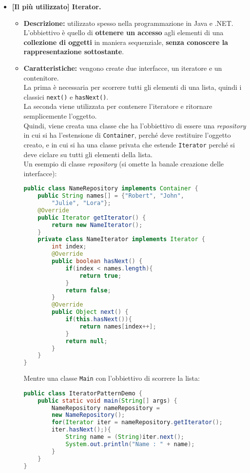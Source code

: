 \documentclass[a4paper,11pt]{article}
\begin{document}
\begin{itemize}
	\item[\ding{42}] \textbf{[Il più utilizzato] Iterator.}
		\begin{itemize}
			\item \textbf{Descrizione:} utilizzato spesso nella programmazione in Java e .NET. L'obbiettivo è quello di \textbf{ottenere un accesso} agli elementi di una \textbf{collezione di oggetti} in maniera sequenziale, \textbf{senza conoscere la rappresentazione sottostante}.
			\item \textbf{Caratteristiche:} vengono create due interfacce, un iteratore e un contenitore.\\
			La prima è necessaria per scorrere tutti gli elementi di una lista, quindi i classici \texttt{next()} e \texttt{hasNext()}.\\
			La seconda viene utilizzata per contenere l'iteratore e ritornare semplicemente l'oggetto.\\
			Quindi, viene creata una classe che ha l'obbiettivo di essere una \emph{repository} in cui si ha l'estensione di \texttt{Container}, perché deve restituire l'oggetto creato, e in cui si ha una classe privata che estende \texttt{Iterator} perché si deve ciclare su tutti gli elementi della lista.\\
			Un esempio di classe \emph{repository} (si omette la banale creazione delle interfacce):
			\begin{lstlisting}[language=Java]
public class NameRepository implements Container {
	public String names[] = {"Robert", "John",
		"Julie", "Lora"}; 
	@Override
	public Iterator getIterator() { 
		return new NameIterator();
	}
	private class NameIterator implements Iterator { 
		int index;
		@Override
		public boolean hasNext() { 
			if(index < names.length){
				return true; 
			}
			return false; 
		}
		@Override
		public Object next() {
			if(this.hasNext()){ 
				return names[index++];
			}
			return null; 
		}
	} 
}
			\end{lstlisting}
			Mentre una classe \texttt{Main} con l'obbiettivo di scorrere la lista:
			\begin{lstlisting}[language=Java]
public class IteratorPatternDemo {
	public static void main(String[] args) {
		NameRepository nameRepository =
		new NameRepository();
		for(Iterator iter = nameRepository.getIterator();
		iter.hasNext();){ 
			String name = (String)iter.next();
			System.out.println("Name : " + name); 
		}
	} 
}
			\end{lstlisting}
		\end{itemize}
\end{itemize}
\end{document}
